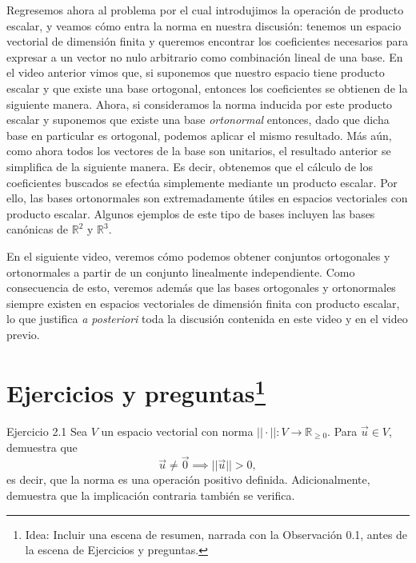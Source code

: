 \documentclass[12pt,dvipsnames]{article}
\numberwithin{equation}{section}
\begin{document}
Regresemos ahora al problema por el cual introdujimos la operación de producto escalar, y veamos cómo entra la norma en nuestra discusión: tenemos un espacio vectorial de dimensión finita y queremos encontrar los coeficientes necesarios para expresar a un vector no nulo arbitrario como combinación lineal de una base. En el video anterior vimos que, si suponemos que nuestro espacio tiene producto escalar y que existe una base ortogonal, entonces los coeficientes se obtienen de la siguiente manera. Ahora, si consideramos la norma inducida por este producto escalar y suponemos que existe una base \emph{ortonormal} entonces, dado que dicha base en particular es ortogonal, podemos aplicar el mismo resultado. Más aún, como ahora todos los vectores de la base son unitarios, el resultado anterior se simplifica de la siguiente manera. Es decir, obtenemos que el cálculo de los coeficientes buscados se efectúa simplemente mediante un producto escalar. Por ello, las bases ortonormales son extremadamente útiles en espacios vectoriales con producto escalar. Algunos ejemplos de este tipo de bases incluyen las bases canónicas de $\mathbb{R}^2$ y $\mathbb{R}^3$. 

En el siguiente video, veremos cómo podemos obtener conjuntos ortogonales y ortonormales a partir de un conjunto linealmente independiente. Como consecuencia de esto, veremos además que las bases ortogonales y ortonormales siempre existen en espacios vectoriales de dimensión finita con producto escalar, lo que justifica \emph{a posteriori} toda la discusión contenida en este video y en el video previo.


\newpage
\section{Ejercicios y preguntas\footnote{Idea: Incluir una escena de resumen, narrada con la Observación 0.1, antes de la escena de Ejercicios y preguntas.}}


Ejercicio 2.1 Sea $V$ un espacio vectorial con norma $||\cdot||:V\to \mathbb{R}_{\geq0}$. Para $\vec{u}\in V$, demuestra que \[
    \vec{u} \neq \vec{0} \implies ||\vec{u}|| > 0,
\] 
es decir, que la norma es una operación positivo definida. Adicionalmente, demuestra que la implicación contraria también se verifica. \\
\end{document}
